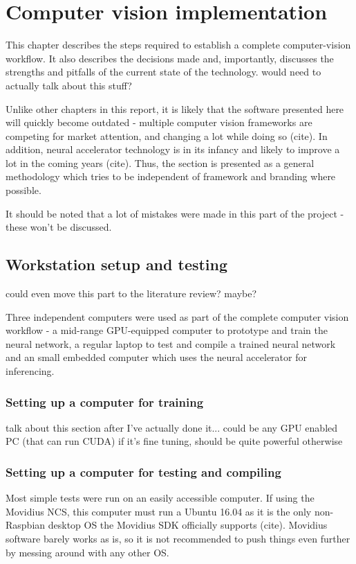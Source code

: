 \chapter{Computer vision implementation}

This chapter describes the steps required to establish a complete computer-vision workflow. It also describes the decisions made and, importantly, discusses the strengths and pitfalls of the current state of the technology. {\color{red} would need to actually talk about this stuff?}

Unlike other chapters in this report, it is likely that the software presented here will quickly become outdated - multiple computer vision frameworks are competing for market attention, and changing a lot while doing so {\color{red} (cite)}. In addition, neural accelerator technology is in its infancy and likely to improve a lot in the coming years {\color{red} (cite)}. Thus, the section is presented as a general methodology which tries to be independent of framework and branding where possible.

It should be noted that a lot of mistakes were made in this part of the project - these won't be discussed.

\section{Workstation setup and testing}
{\color{red} could even move this part to the literature review? maybe?}

Three independent computers were used as part of the complete computer vision workflow - a mid-range GPU-equipped computer to prototype and train the neural network, a regular laptop to test and compile a trained neural network and an small embedded computer which uses the neural accelerator for inferencing.

\subsection{Setting up a computer for training}
{\Large \color{red} talk about this section after I've actually done it...}
{\Large \color{red} could be any GPU enabled PC (that can run CUDA) if it's fine tuning, should be quite powerful otherwise}

\subsection{Setting up a computer for testing and compiling}
Most simple tests were run on an easily accessible computer. If using the Movidius NCS, this computer must run a Ubuntu 16.04 as it is the only non-Raspbian desktop OS the Movidius SDK officially supports {\color{red} (cite)}. Movidius software barely works as is, so it is not recommended to push things even further by messing around with any other OS.


